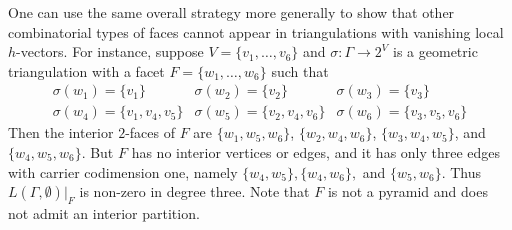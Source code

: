 \documentclass[ALCO, Unicode,published]{cedram}
\begin{document}
\begin{remark}\label{rem:newnonvanish}
One can use the same overall strategy more generally to show that other combinatorial types of faces cannot appear in triangulations with vanishing local $h$-vectors.  For instance, suppose $V = \{v_1, \ldots, v_6\}$ and $\sigma \colon \Gamma \to 2^V$ is a geometric  triangulation with a facet $F = \{w_1, \ldots, w_6\}$ such that 
\[
\begin{array}{lll}
\sigma(w_1) = \{ v_1\} & \sigma(w_2) = \{ v_2 \} & \sigma(w_3) = \{ v_3 \} \\
\sigma(w_4) = \{ v_1, v_4, v_5 \} & \sigma(w_5) = \{ v_2, v_4, v_6 \} & \sigma(w_6) = \{ v_3, v_5, v_6 \}
\end{array}
\]
Then the interior $2$-faces of $F$ are $\{w_1, w_5, w_6\}$, $\{w_2, w_4, w_6\}$, $\{w_3, w_4, w_5\}$, and $\{w_4, w_5, w_6\}$. But $F$ has no interior vertices or edges, and it has only three edges with carrier codimension one, namely $\{w_4, w_5\}, \{w_4, w_6\},$ and $\{w_5, w_6\}$. Thus $L(\Gamma, \emptyset)|_{F}$ is non-zero in degree three. Note that $F$ is not a pyramid and does not admit an interior partition. 
\end{remark}





\end{document}
